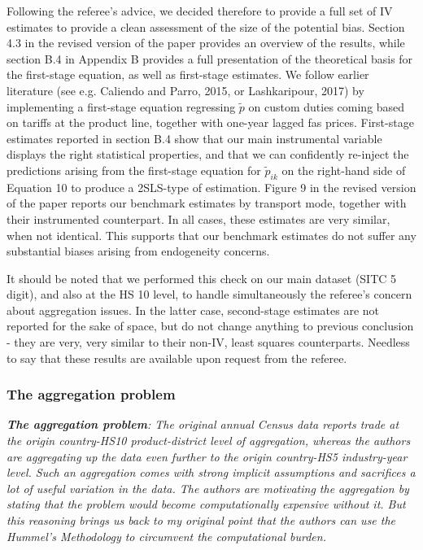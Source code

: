 \documentclass[a4paper,11pt]{article}
\begin{document}
Following the referee's advice, we decided therefore to provide a full set of IV estimates to provide a clean assessment of the size of the potential bias. Section 4.3 in the revised version of the paper provides an overview of the results, while section B.4 in Appendix B provides a full presentation of the theoretical basis for the first-stage equation, as well as first-stage estimates. We follow earlier literature (see e.g. Caliendo and Parro, 2015, or Lashkaripour, 2017) by implementing a first-stage equation regressing $\widetilde{p}$ on custom duties coming based on tariffs at the product line, together with one-year lagged fas prices. First-stage estimates reported in section B.4 show that our main instrumental variable displays the right statistical properties, and that we can confidently re-inject the predictions arising from the first-stage equation for $\widetilde{p}_{ik}$ on the right-hand side of Equation 10 to produce a 2SLS-type of estimation. Figure 9 in the revised version of the paper reports our benchmark estimates by transport mode, together with their instrumented counterpart. In all cases, these estimates are very similar, when not identical. This supports that our benchmark estimates do not suffer any substantial biases arising from endogeneity concerns.

It should be noted that we performed this check on our main dataset (SITC 5 digit), and also at the HS 10 level, to handle simultaneously the referee's concern about aggregation issues. In the latter case, second-stage estimates are not reported for the sake of space, but do not change anything to previous conclusion - they are very, very similar to their non-IV, least squares counterparts. Needless to say that these results are available upon request from the referee.


\subsubsection{The aggregation problem}

\textit{\textbf{The aggregation problem}: The original annual Census data reports
trade at the origin country-HS10 product-district level of aggregation,
whereas the authors are aggregating up the data even further to the origin
country-HS5 industry-year level. Such an aggregation comes with strong implicit assumptions and sacrifices a lot of useful variation in the data.
The authors are motivating the aggregation by stating that the problem
would become computationally expensive without it. But this reasoning
brings us back to my original point that the authors can use the Hummel's
Methodology to circumvent the computational burden.}
\end{document}
